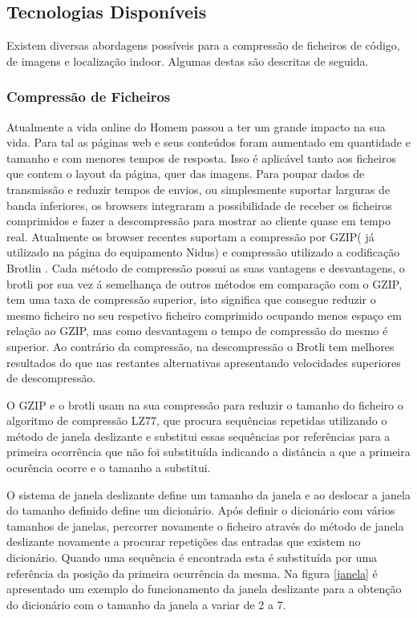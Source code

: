 \subsection{Tecnologias Disponíveis} \label{compressaoFicheiros}

Existem diversas abordagens possíveis para a compressão de ficheiros de código, de imagens e localização indoor. Algumas destas são descritas de seguida.

\subsubsection{Compressão de Ficheiros} 
\par
Atualmente a vida online do Homem passou a ter um grande impacto na sua vida. Para tal as páginas web e seus conteúdos foram aumentado em quantidade e tamanho e com menores tempos de resposta. Isso é aplicável tanto aos ficheiros que contem o layout da página, quer das imagens. Para poupar dados de transmissão e reduzir tempos de envios, ou simplesmente suportar larguras de banda inferiores, os browsers integraram a possibilidade de receber os ficheiros comprimidos e fazer a descompressão para mostrar ao cliente quase em tempo real. Atualmente os browser recentes suportam a compressão por GZIP( já utilizado na página do equipamento Nidus) e compressão utilizado a codificação Brotlin \cite{Alakuijala2019} \cite{brotlirfc}.
Cada método de compressão possui as suas vantagens e desvantagens, o brotli por sua vez á semelhança de outros métodos em comparação com o GZIP, tem uma taxa de compressão superior\cite{Alakuijala2015}, isto significa que consegue reduzir o mesmo ficheiro no seu respetivo ficheiro comprimido ocupando menos espaço em relação ao GZIP, mas como desvantagem o tempo de compressão do mesmo é superior. Ao contrário da compressão, na descompressão o Brotli tem melhores resultados do que nas restantes alternativas apresentando velocidades superiores de descompressão.
\par
O GZIP e o brotli usam na sua compressão para reduzir o tamanho do ficheiro o algoritmo de compressão LZ77, que procura sequências repetidas utilizando o método de janela deslizante e substitui essas sequências por referências para a primeira ocorrência que não foi substituída indicando a distância a que a primeira ocurência ocorre e o tamanho a substitui.
\par O sistema de janela deslizante define um tamanho da janela e ao deslocar a janela do tamanho definido define um dicionário. Após definir o dicionário com vários tamanhos de janelas, percorrer novamente o ficheiro através do método de janela deslizante novamente a procurar repetições das entradas que existem no dicionário. Quando uma sequência é encontrada esta é substituída  por uma referência da posição da primeira ocurrência da mesma. Na figura \ref{janela} é apresentado um exemplo do funcionamento da janela deslizante para a obtenção do dicionário com o tamanho da janela a variar de 2 a 7.
